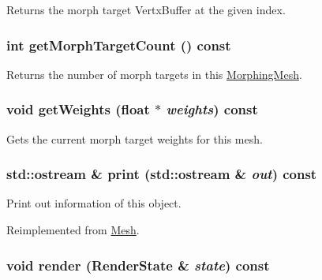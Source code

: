 Returns the morph target VertxBuffer at the given index. \hypertarget{classm3g_1_1MorphingMesh_620d9684124201f738a28c7c39641541}{
\subsubsection[{getMorphTargetCount}]{\setlength{\rightskip}{0pt plus 5cm}int getMorphTargetCount () const}}
\label{classm3g_1_1MorphingMesh_620d9684124201f738a28c7c39641541}


Returns the number of morph targets in this \hyperlink{classm3g_1_1MorphingMesh}{MorphingMesh}. \hypertarget{classm3g_1_1MorphingMesh_80cef3b2c5e4881567409829de224e46}{
\subsubsection[{getWeights}]{\setlength{\rightskip}{0pt plus 5cm}void getWeights (float $\ast$ {\em weights}) const}}
\label{classm3g_1_1MorphingMesh_80cef3b2c5e4881567409829de224e46}


Gets the current morph target weights for this mesh. \hypertarget{classm3g_1_1MorphingMesh_6fea17fa1532df3794f8cb39cb4f911f}{
\subsubsection[{print}]{\setlength{\rightskip}{0pt plus 5cm}std::ostream \& print (std::ostream \& {\em out}) const}}
\label{classm3g_1_1MorphingMesh_6fea17fa1532df3794f8cb39cb4f911f}


Print out information of this object. 

Reimplemented from \hyperlink{classm3g_1_1Mesh_6fea17fa1532df3794f8cb39cb4f911f}{Mesh}.\hypertarget{classm3g_1_1MorphingMesh_8babc8a79b78615da51161e94029eea9}{
\subsubsection[{render}]{\setlength{\rightskip}{0pt plus 5cm}void render ({\bf RenderState} \& {\em state}) const}}
\label{classm3g_1_1MorphingMesh_8babc8a79b78615da51161e94029eea9}


